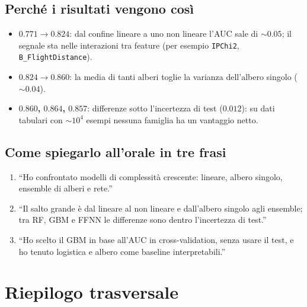 \documentclass[11pt,a4paper]{article}
\newcommand{\code}[1]{\texttt{#1}}
\begin{document}
\subsection*{Perch\'e i risultati vengono cos\`i}
\begin{itemize}
\item \textbf{$0.771\to0.824$}: dal confine lineare a uno non lineare l'AUC sale di $\sim0.05$; il segnale sta nelle interazioni tra feature (per esempio \code{IPChi2}, \code{B\_FlightDistance}).
\item \textbf{$0.824\to0.860$}: la media di tanti alberi toglie la varianza dell'albero singolo ($\sim0.04$).
\item \textbf{$0.860$, $0.864$, $0.857$}: differenze sotto l'incertezza di test ($0.012$): su dati tabulari con $\sim10^4$ esempi nessuna famiglia ha un vantaggio netto.
\end{itemize}

\subsection*{Come spiegarlo all'orale in tre frasi}
\begin{enumerate}
\item ``Ho confrontato modelli di complessit\`a crescente: lineare, albero singolo, ensemble di alberi e rete.''
\item ``Il salto grande \`e dal lineare al non lineare e dall'albero singolo agli ensemble; tra RF, GBM e FFNN le differenze sono dentro l'incertezza di test.''
\item ``Ho scelto il GBM in base all'AUC in cross-validation, senza usare il test, e ho tenuto logistica e albero come baseline interpretabili.''
\end{enumerate}

\clearpage
\section{Riepilogo trasversale}
\end{document}
